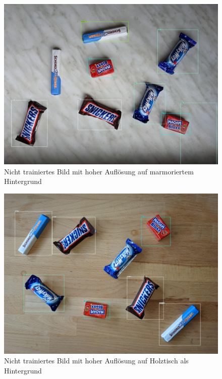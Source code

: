    \begin{figure}[H]
        \centering
        \includegraphics[angle = 90, width = \textwidth]{Bilder/models/model_comparison/ssd_mobilenet_v1_fpn_640x640_coco17_tpu-8/HD_on_marble.jpg}
        \caption{Nicht trainiertes Bild mit hoher Auflösung auf marmoriertem Hintergrund}
    \end{figure}
    
    \begin{figure}[H]
        \centering
        \includegraphics[angle = 90, width = \textwidth]{Bilder/models/model_comparison/ssd_mobilenet_v1_fpn_640x640_coco17_tpu-8/HD_on_wood.jpg}
        \caption{Nicht trainiertes Bild mit hoher Auflösung auf Holztisch als Hintergrund}
    \end{figure}
    
